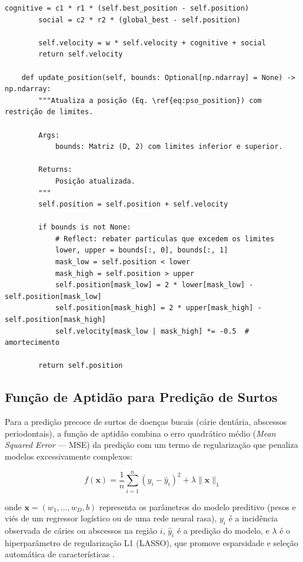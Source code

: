 \begin{lstlisting}[style=pythonstyle, caption=Classe Particle do MiroFish Swarm, label=code:particle]
        cognitive = c1 * r1 * (self.best_position - self.position)
        social = c2 * r2 * (global_best - self.position)
        
        self.velocity = w * self.velocity + cognitive + social
        return self.velocity
    
    def update_position(self, bounds: Optional[np.ndarray] = None) -> np.ndarray:
        """Atualiza a posição (Eq. \ref{eq:pso_position}) com restrição de limites.
        
        Args:
            bounds: Matriz (D, 2) com limites inferior e superior.
        
        Returns:
            Posição atualizada.
        """
        self.position = self.position + self.velocity
        
        if bounds is not None:
            # Reflect: rebater partículas que excedem os limites
            lower, upper = bounds[:, 0], bounds[:, 1]
            mask_low = self.position < lower
            mask_high = self.position > upper
            self.position[mask_low] = 2 * lower[mask_low] - self.position[mask_low]
            self.position[mask_high] = 2 * upper[mask_high] - self.position[mask_high]
            self.velocity[mask_low | mask_high] *= -0.5  # amortecimento
        
        return self.position
\end{lstlisting}

\subsection{Função de Aptidão para Predição de Surtos}

Para a predição precoce de surtos de doenças bucais (cárie dentária, abscessos periodontais), a função de aptidão combina o erro quadrático médio (\textit{Mean Squared Error} --- MSE) da predição com um termo de regularização que penaliza modelos excessivamente complexos:

\begin{equation}
f(\mathbf{x}) = \frac{1}{n} \sum_{i=1}^n (y_i - \hat{y}_i)^2 + \lambda \|\mathbf{x}\|_1
\label{eq:fitness_outbreak}
\end{equation}

onde $\mathbf{x} = (w_1, \ldots, w_D, b)$ representa os parâmetros do modelo preditivo (pesos e viés de um regressor logístico ou de uma rede neural rasa), $y_i$ é a incidência observada de cáries ou abscessos na região $i$, $\hat{y}_i$ é a predição do modelo, e $\lambda$ é o hiperparâmetro de regularização L1 (LASSO), que promove esparsidade e seleção automática de características \cite{zhang2015pso}.

